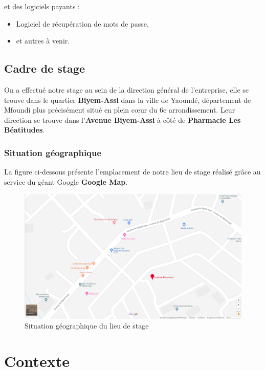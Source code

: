 					et des logiciels payants :
					\begin{itemize}
						\item Logiciel de récupération de mots de passe,
						\item et autres à venir.
					\end{itemize}
			
		
		\subsection{Cadre de stage}
			On a effectué notre stage au sein de la direction général de l'entreprise, elle se trouve dans le quartier \textbf{Biyem-Assi} dans la ville de Yaoundé, département de Mfoundi plus précisément situé en plein cœur du 6e arrondissement. Leur direction se trouve dans l'\textbf{Avenue Biyem-Assi} à côté de \textbf{Pharmacie Les Béatitudes}.\\
		
			\subsubsection{Situation géographique}
			La figure ci-dessous présente l’emplacement de notre lieu de stage réalisé grâce au service du géant Google  \textbf{Google Map}.
				\begin{figure}[h]
					\centering
					\includegraphics[scale=0.3]{../imgs/cartemap}
					\caption{Situation géographique du lieu de stage}
					\label{fig1}
			\end{figure}
			
	\section{Contexte}
	
